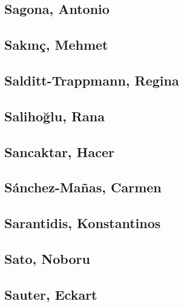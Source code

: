 \subsection[Sagona, Antonio (1)]{Sagona, Antonio}

\subsection[Sakınç, Mehmet (1)]{Sakınç, Mehmet}

\subsection[Salditt-Trappmann, Regina (1)]{Salditt-Trappmann, Regina}

\subsection[Salihoğlu, Rana (1)]{Salihoğlu, Rana}

\subsection[Sancaktar, Hacer (1)]{Sancaktar, Hacer}

\subsection[Sánchez-Mañas, Carmen (1)]{Sánchez-Mañas, Carmen}

\subsection[Sarantidis, Konstantinos (2)]{Sarantidis, Konstantinos}


\subsection[Sato, Noboru (1)]{Sato, Noboru}

\subsection[Sauter, Eckart (1)]{Sauter, Eckart}

